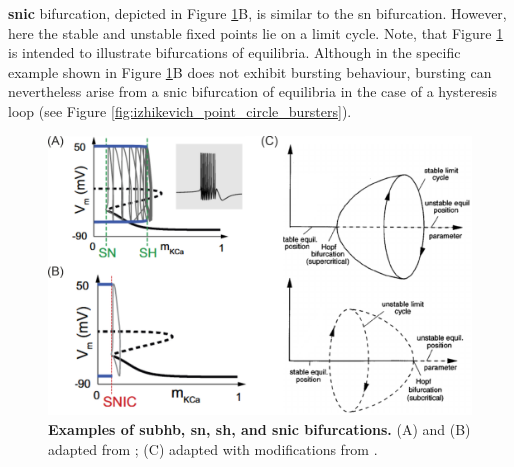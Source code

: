 \documentclass[../main.tex]{subfiles}
\begin{document}
\textbf{\gls{snic}} bifurcation, depicted in Figure \ref{fig:example_bifurcations_subhb_sn_sh_snic}B, is similar to the \gls{sn} bifurcation. However, here the stable and unstable fixed points lie on a limit cycle. Note, that Figure \ref{fig:example_bifurcations_subhb_sn_sh_snic} is intended to illustrate bifurcations of equilibria. Although in the specific example shown in Figure \ref{fig:example_bifurcations_subhb_sn_sh_snic}B does not exhibit bursting behaviour, bursting can nevertheless arise from a \gls{snic} bifurcation of equilibria in the case of a hysteresis loop (see Figure \ref{fig:izhikevich_point_circle_bursters}).

\begin{figure}[!t]
    \centering
    \includegraphics[width=0.95\linewidth]{../img/2_mathematical_overview/bifurcation_examples.png}
    \caption[Examples of \gls{subhb}, \gls{sn}, \gls{sh}, and \gls{snic} bifurcations]{
        \textbf{Examples of \gls{subhb}, \gls{sn}, \gls{sh}, and \gls{snic} bifurcations.}
        (A) and (B) adapted from \parencite{franciRobustTunableBursting2018}; (C) adapted with modifications from \parencite{luceroTheoreticalStudyHysteresis1999}.
    }
    \label{fig:example_bifurcations_subhb_sn_sh_snic}
\end{figure}
\end{document}
